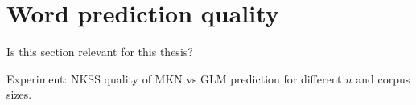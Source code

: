 \section{Word prediction quality}

\begin{draft}
Is this section relevant for this thesis?

Experiment: NKSS quality of MKN vs GLM prediction for different $n$ and corpus
sizes.
\end{draft}
